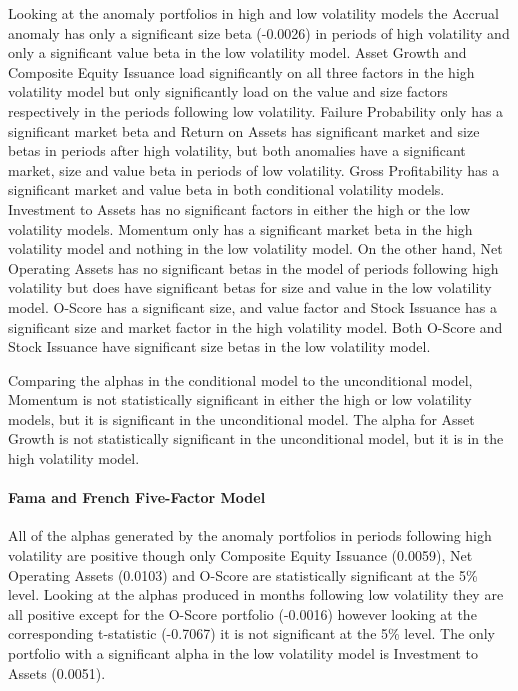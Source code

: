 \documentclass[12pt, a4paper, oneside]{article}
\begin{document}
Looking at the anomaly portfolios in high and low volatility models the Accrual anomaly has only a significant size beta (-0.0026) in periods of high volatility and only a significant value beta in the low volatility model. Asset Growth and Composite Equity Issuance load significantly on all three factors in the high volatility model but only significantly load on the value and size factors respectively in the periods following low volatility. Failure Probability only has a significant market beta and Return on Assets has significant market and size betas in periods after high volatility, but both anomalies have a significant market, size and value beta in periods of low volatility. Gross Profitability has a significant market and value beta in both conditional volatility models. Investment to Assets has no significant factors in either the high or the low volatility models. Momentum only has a significant market beta in the high volatility model and nothing in the low volatility model. On the other hand, Net Operating Assets has no significant betas in the model of periods following high volatility but does have significant betas for size and value in the low volatility model. O-Score has a significant size, and value factor and Stock Issuance has a significant size and market factor in the high volatility model. Both O-Score and Stock Issuance have significant size betas in the low volatility model.

Comparing the alphas in the conditional model to the unconditional model, Momentum is not statistically significant in either the high or low volatility models, but it is significant in the unconditional model. The alpha for Asset Growth is not statistically significant in the unconditional model, but it is in the high volatility model.

\paragraph{Fama and French Five-Factor Model}
All of the alphas generated by the anomaly portfolios in periods following high volatility are positive though only Composite Equity Issuance (0.0059), Net Operating Assets (0.0103) and O-Score are statistically significant at the 5\% level. Looking at the alphas produced in months following low volatility they are all positive except for the O-Score portfolio (-0.0016) however looking at the corresponding t-statistic (-0.7067) it is not significant at the 5\% level. The only portfolio with a significant alpha in the low volatility model is Investment to Assets (0.0051).
\end{document}
